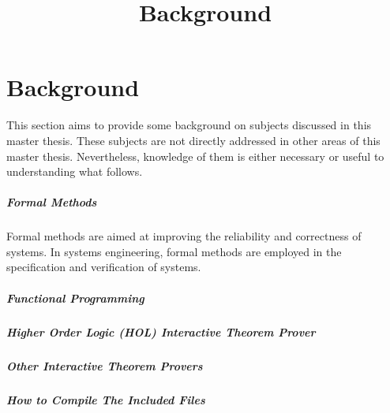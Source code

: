 \documentclass[../../main/main.tex]{subfiles}
\begin{document}
\title{Background}

\chapter{Background}
This section aims to provide some background on subjects discussed in this master thesis.  These subjects are not directly addressed in other areas of this master thesis.  Nevertheless, knowledge of them is either necessary or useful to understanding what follows.

\paragraph*{Formal Methods}
Formal methods are aimed at improving the reliability and correctness of systems\cite{formalmethodslcarke}.  In systems engineering, formal methods are employed in the specification and verification of systems.

\paragraph*{Functional Programming}
\paragraph*{Higher Order Logic (HOL) Interactive Theorem Prover}
\paragraph*{Other Interactive Theorem Provers}
\paragraph*{How to Compile The Included Files}
\end{document}
